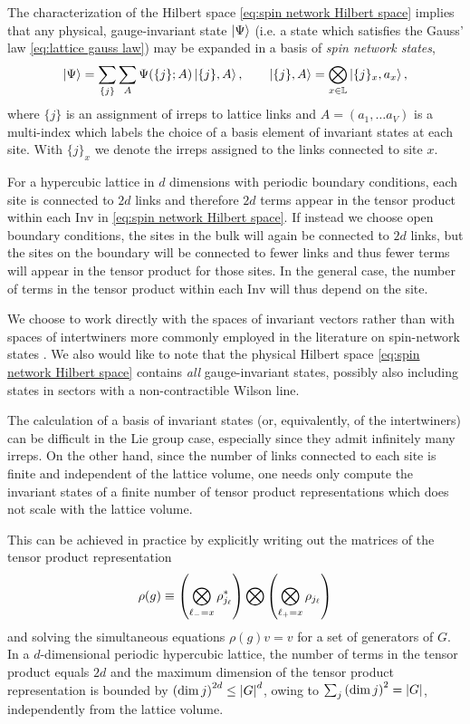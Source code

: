 The characterization of the Hilbert space \eqref{eq:spin network Hilbert space} implies that any physical, gauge-invariant state $\ket{\Psi}$ (i.e.
a state which satisfies the Gauss' law \eqref{eq:lattice gauss law}) may be expanded in a basis of \emph{spin network states},
\begin{equation}
    \ket{\Psi} = \sum_{ \{j\} } \sum_{ A } \Psi(\{j\}; A) \ket{\{j\},A}, \qquad \ket{\{j\},A} = \bigotimes_{x \in \mathbb{L}} \ket{\{j\}_x,a_x},
\end{equation}
where $\{j\}$ is an assignment of irreps to lattice links and $A=(a_1, \ldots a_V)$ is a multi-index which labels the choice of a basis element of invariant states at each site.
With $\{j\}_x$ we denote the irreps assigned to the links connected to site $x$.

For a hypercubic lattice in $d$ dimensions with periodic boundary conditions, each site is connected to $2d$ links and therefore $2d$ terms appear in the tensor product within each $\mathrm{Inv}$ in \eqref{eq:spin network Hilbert space}.
If instead we choose open boundary conditions, the sites in the bulk will again be connected to $2d$ links, but the sites on the boundary will be connected to fewer links and thus fewer terms will appear in the tensor product for those sites.
In the general case, the number of terms in the tensor product within each $\mathrm{Inv}$ will thus depend on the site.

We choose to work directly with the spaces of invariant vectors rather than with spaces of intertwiners more commonly employed in the literature on spin-network states \cite{baez1996spinnetworks, burgio2000physical}.
We also would like to note that the physical Hilbert space \eqref{eq:spin network Hilbert space} contains \emph{all} gauge-invariant states, possibly also including states in sectors with a non-contractible Wilson line.

\medskip

The calculation of a basis of invariant states (or, equivalently, of the intertwiners) can be difficult in the Lie group case, especially since they admit infinitely many irreps.
On the other hand, since the number of links connected to each site is finite and independent of the lattice volume, one needs only compute the invariant states of a finite number of tensor product representations which does not scale with the lattice volume.

This can be achieved in practice by explicitly writing out the matrices of the tensor product representation
\begin{equation*}
    \rho(g) \equiv
    \pqty{\bigotimes_{\link_{-}=x} \rho_{j_{\link}}^*} \bigotimes
    \pqty{\bigotimes_{\link_{+}=x} \rho_{j_{\link}} }
\end{equation*}
and solving the simultaneous equations $\rho(g) v = v$ for a set of generators of $G$.
In a $d$-dimensional periodic hypercubic lattice, the number of terms in the tensor product equals $2d$ and the maximum dimension of the tensor product representation is bounded by $\pqty{\dim{j}}^{2d} \leq \abs{G}^d$, owing to $\sum_j \pqty{\dim{j}}^2 = \abs{G}$, independently from the lattice volume.

